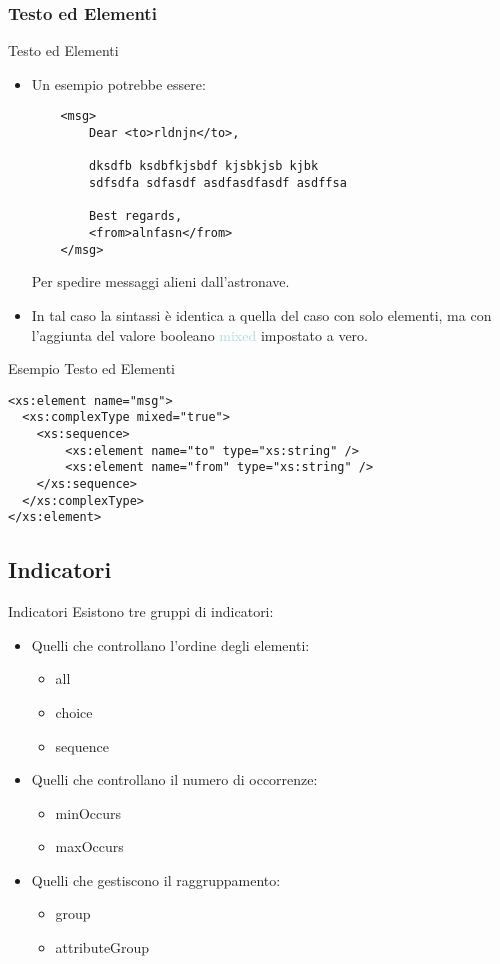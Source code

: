 \documentclass{beamer}
\begin{document}
	\subsubsection{Testo ed Elementi}
	\begin{frame}[containsverbatim]{Testo ed Elementi}
	\begin{itemize}
	\item Un esempio potrebbe essere:
	\begin{lstlisting}
	<msg>
		Dear <to>rldnjn</to>,
		
		dksdfb ksdbfkjsbdf kjsbkjsb kjbk
		sdfsdfa sdfasdf asdfasdfasdf asdffsa
		
		Best regards,
		<from>alnfasn</from>
	</msg>
	\end{lstlisting}
	Per spedire messaggi alieni dall'astronave.
	\item In tal caso la sintassi è identica a quella del caso con solo elementi, ma con l'aggiunta del valore booleano \textcolor{lightblue}{mixed} impostato a vero.
	\end{itemize}
	\end{frame}
		\begin{frame}[containsverbatim]
	\begin{block}{Esempio Testo ed Elementi}
	\begin{lstlisting}
<xs:element name="msg">
  <xs:complexType mixed="true">
  	<xs:sequence>
  		<xs:element name="to" type="xs:string" />
  		<xs:element name="from" type="xs:string" />
  	</xs:sequence>
  </xs:complexType>
</xs:element> 
	\end{lstlisting}
	\end{block}
	\end{frame}
	\subsection{Indicatori}	
	\begin{frame}{Indicatori}
	Esistono tre gruppi di indicatori:
	\begin{itemize}
	\item Quelli che controllano l'ordine degli elementi:
		\begin{itemize}
		\item all
		\item choice
		\item sequence
		\end{itemize}
	\item Quelli che controllano il numero di occorrenze:
		\begin{itemize}
		\item minOccurs
		\item maxOccurs
		\end{itemize}
	\item Quelli che gestiscono il raggruppamento:
		\begin{itemize}
		\item group
		\item attributeGroup
		\end{itemize}
	\end{itemize}
	\end{frame}
\end{document}
